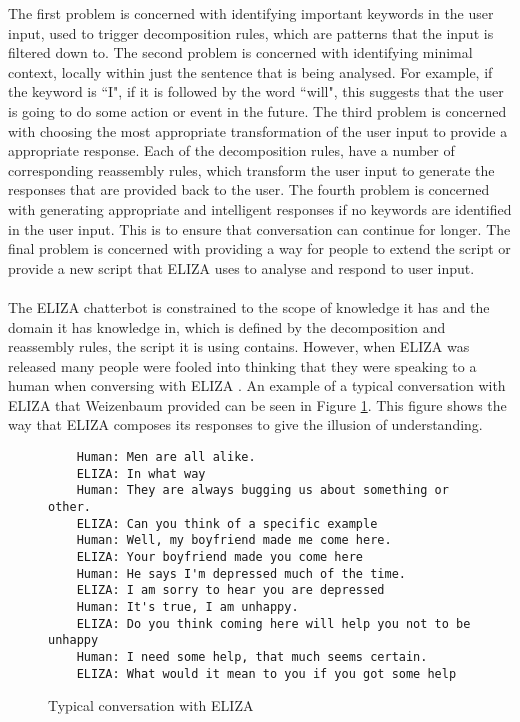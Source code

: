 \noindent
The first problem is concerned with identifying important keywords in the user input, used to trigger decomposition rules, which are patterns that the input is filtered down to. The second problem is concerned with identifying minimal context, locally within just the sentence that is being analysed. For example, if the keyword is ``I", if it is followed by the word ``will", this suggests that the user is going to do some action or event in the future. The third problem is concerned with choosing the most appropriate transformation of the user input to provide a appropriate response. Each of the decomposition rules, have a number of corresponding reassembly rules, which transform the user input to generate the responses that are provided back to the user. The fourth problem is concerned with generating appropriate and intelligent responses if no keywords are identified in the user input. This is to ensure that conversation can continue for longer. The final problem is concerned with providing a way for people to extend the script or provide a new script that ELIZA uses to analyse and respond to user input.\\\\
The ELIZA chatterbot is constrained to the scope of knowledge it has and the domain it has knowledge in, which is defined by the decomposition and reassembly rules, the script it is using contains. However, when ELIZA was released many people were fooled into thinking that they were speaking to a human when conversing with ELIZA \autocite{shum2018eliza}. An example of a typical conversation with ELIZA that Weizenbaum provided can be seen in Figure \ref{fig:example-eliza-conversation}. This figure shows the way that ELIZA composes its responses to give the illusion of understanding.\\

\begin{figure}[H]
	\centering
	\hspace*{-2cm} 
	\begin{BVerbatim}
	Human: Men are all alike.
	ELIZA: In what way
	Human: They are always bugging us about something or other.
	ELIZA: Can you think of a specific example
	Human: Well, my boyfriend made me come here.
	ELIZA: Your boyfriend made you come here
	Human: He says I'm depressed much of the time.
	ELIZA: I am sorry to hear you are depressed
	Human: It's true, I am unhappy.
	ELIZA: Do you think coming here will help you not to be unhappy
	Human: I need some help, that much seems certain.
	ELIZA: What would it mean to you if you got some help
	\end{BVerbatim}
	
	\caption{Typical conversation with ELIZA \autocite{weizenbaum-eliza1966}}
	\label{fig:example-eliza-conversation}
\end{figure}

